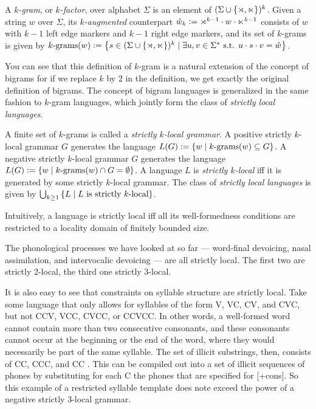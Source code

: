 \begin{definition}[$k$-grams]
    A \emph{$k$-gram}, or \emph{$k$-factor}, over alphabet $\Sigma$ is an element of $(\Sigma \cup \setof{\LeftEdge, \RightEdge})^k$.
    Given a string $w$ over $\Sigma$, its \emph{$k$-augmented} counterpart $\augmented{w}_k \is \LeftEdge^{k-1} \stringcat w \stringcat \RightEdge^{k-1}$ consists of $w$ with $k-1$ left edge markers and $k-1$ right edge markers, and its set of $k$-grams is given by
    \(
        \Bigrams[k](w) \is
            \setof{
                s \in (\Sigma \cup \setof{\LeftEdge, \RightEdge})^k
                \mid
                \exists u,v \in \Sigma^* \text{ s.t. }
                u \stringcat s \stringcat v = \augmented{w}
            }
    \).
\end{definition}
%
You can see that this definition of $k$-gram is a natural extension of the concept of bigrams for if we replace $k$ by $2$ in the definition, we get exactly the original definition of bigrams.
The concept of bigram languages is generalized in the same fashion to $k$-gram languages, which jointly form the class of \emph{strictly local languages}.
%
\begin{definition}
    A finite set of $k$-grams is called a \emph{strictly $k$-local grammar}.
    A positive strictly $k$-local grammar $G$ generates the language
    \(
        L(G) \is
            \setof{ w \mid \Bigrams[k](w) \subseteq G }
    \).
    A negative strictly $k$-local grammar $G$ generates the language
    \(
        L(G) \is
            \setof{ w \mid \Bigrams[k](w) \cap G = \emptyset }
    \).
    A language $L$ is \emph{strictly $k$-local} iff it is generated by some strictly $k$-local grammar.
    The class of \emph{strictly local languages} is given by
    \(
        \bigcup_{k \geq 1} \setof{ L \mid L \text{ is strictly $k$-local} }
    \).
\end{definition}
%
Intuitively, a language is strictly local iff all its well-formedness conditions are restricted to a locality domain of finitely bounded size.

The phonological processes we have looked at so far --- word-final devoicing, nasal assimilation, and intervocalic devoicing --- are all strictly local.
The first two are strictly 2-local, the third one strictly 3-local.

It is also easy to see that constraints on syllable structure are strictly local.
Take some language that only allows for syllables of the form V, VC, CV, and CVC, but not CCV, VCC, CVCC, or CCVCC\@.
In other words, a well-formed word cannot contain more than two consecutive consonants, and these consonants cannot occur at the beginning or the end of the word, where they would necessarily be part of the same syllable.
The set of illicit substrings, then, consists of \LeftEdge CC, CCC, and CC \RightEdge.
This can be compiled out into a set of illicit sequences of phones by substituting for each C the phones that are specified for [+cons].
So this example of a restricted syllable template does note exceed the power of a negative strictly $3$-local grammar.

